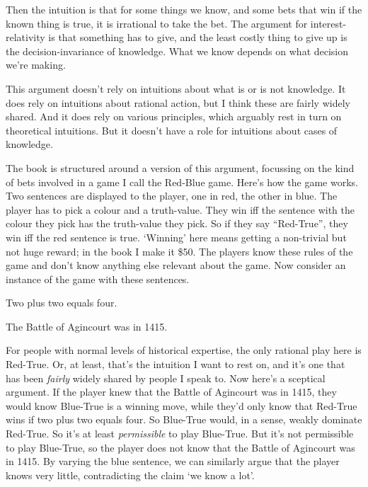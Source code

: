 \documentclass[
  11pt,
  letterpaper,
  DIV=11,
  numbers=noendperiod,
  twoside]{scrartcl}
\providecommand{\tightlist}{%
  \setlength{\itemsep}{0pt}\setlength{\parskip}{0pt}}
\begin{document}
Then the intuition is that for some things we know, and some bets that
win if the known thing is true, it is irrational to take the bet. The
argument for interest-relativity is that something has to give, and the
least costly thing to give up is the decision-invariance of knowledge.
What we know depends on what decision we're making.

This argument doesn't rely on intuitions about what is or is not
knowledge. It does rely on intuitions about rational action, but I think
these are fairly widely shared. And it does rely on various principles,
which arguably rest in turn on theoretical intuitions. But it doesn't
have a role for intuitions about cases of knowledge.

The book is structured around a version of this argument, focussing on
the kind of bets involved in a game I call the Red-Blue game. Here's how
the game works. Two sentences are displayed to the player, one in red,
the other in blue. The player has to pick a colour and a truth-value.
They win iff the sentence with the colour they pick has the truth-value
they pick. So if they say ``Red-True'', they win iff the red sentence is
true. `Winning' here means getting a non-trivial but not huge reward; in
the book I make it \$50. The players know these rules of the game and
don't know anything else relevant about the game. Now consider an
instance of the game with these sentences.

\begin{description}
\tightlist
\item[Red]
Two plus two equals four.
\item[Blue]
The Battle of Agincourt was in 1415.
\end{description}

For people with normal levels of historical expertise, the only rational
play here is Red-True. Or, at least, that's the intuition I want to rest
on, and it's one that has been \emph{fairly} widely shared by people I
speak to. Now here's a sceptical argument. If the player knew that the
Battle of Agincourt was in 1415, they would know Blue-True is a winning
move, while they'd only know that Red-True wins if two plus two equals
four. So Blue-True would, in a sense, weakly dominate Red-True. So it's
at least \emph{permissible} to play Blue-True. But it's not permissible
to play Blue-True, so the player does not know that the Battle of
Agincourt was in 1415. By varying the blue sentence, we can similarly
argue that the player knows very little, contradicting the claim `we
know a lot'.
\end{document}
